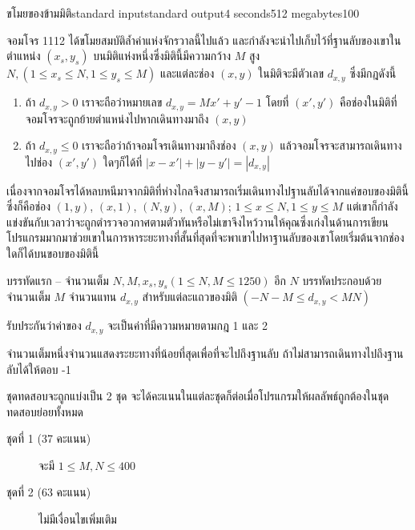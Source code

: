 \documentclass[11pt,a4paper]{article}
\begin{document}
\begin{problem}{ขโมยของข้ามมิติ}{standard input}{standard output}{4 seconds}{512 megabytes}{100}

จอมโจร 1112 ได้ขโมยสมบัติล้ำค่าแห่งจักรวาลนี้ไปแล้ว และกำลังจะนำไปเก็บไว้ที่ฐานลับของเขาในตำแหน่ง $(x_s,y_s)$ บนมิติแห่งหนึ่งซึ่งมิตินี้มีความกว้าง $M$ สูง $N, (1 \leq x_s \leq N,1 \leq y_s\leq M)$ และแต่ละช่อง $(x,y)$ ในมิติจะมีตัวเลข $d_{x,y}$ ซึ่งมีกฎดังนี้
\begin{enumerate}
\item 
ถ้า $d_{x,y}>0$ เราจะถือว่าหมายเลข $d_{x,y} = Mx' + y'-1$ โดยที่ $(x',y')$ คือช่องในมิติที่จอมโจรจะถูกย้ายตำแหน่งไปหากเดินทางมาถึง $(x,y)$

\item 	ถ้า $d_{x,y} \leq 0$ เราจะถือว่าถ้าจอมโจรเดินทางมาถึงช่อง $(x,y)$ แล้วจอมโจรจะสามารถเดินทางไปช่อง $(x',y')$ ใดๆก็ได้ที่ $|x-x' |+|y-y' |=|d_{x,y}|$

\end{enumerate}

เนื่องจากจอมโจรได้หลบหนีมาจากมิติที่ห่างไกลจึงสามารถเริ่มเดินทางไปฐานลับได้จากแค่ขอบของมิตินี้ ซึ่งก็คือช่อง $(1,y)$, $(x,1)$, 
$(N, y)$, $(x, M)$; $1 \leq x \leq N,1 \leq y \leq M$ แต่เขาก็กำลังแข่งขันกับเวลาว่าจะถูกตำรวจอวกาศตามตัวทันหรือไม่เขาจึงไหว้วานให้คุณซึ่งเก่งในด้านการเขียนโปรแกรมมากมาช่วยเขาในการหาระยะทางที่สั้นที่สุดที่จะพาเขาไปหาฐานลับของเขาโดยเริ่มต้นจากช่องใดก็ได้บนขอบของมิตินี้

\InputFile
บรรทัดแรก – จำนวนเต็ม $N,M,x_s,y_s (1 \leq N,M \leq 1250) $
อีก $N$ บรรทัดประกอบด้วยจำนวนเต็ม $M$ จำนวนแทน $d_{x,y}$ สำหรับแต่ละแถวของมิติ $(-N-M \leq d_{x,y} < MN)$

รับประกันว่าค่าของ $d_{x,y}$ จะเป็นค่าที่มีความหมายตามกฎ 1 และ 2

\OutputFile
จำนวนเต็มหนึ่งจำนวนแสดงระยะทางที่น้อยที่สุดเพื่อที่จะไปถึงฐานลับ ถ้าไม่สามารถเดินทางไปถึงฐานลับได้ให้ตอบ -1

\Scoring
ชุดทดสอบจะถูกแบ่งเป็น 2 ชุด จะได้คะแนนในแต่ละชุดก็ต่อเมื่อโปรแกรมให้ผลลัพธ์ถูกต้องในชุดทดสอบย่อยทั้งหมด

\begin{description}

\item[ชุดที่ 1 (37 คะแนน)] จะมี $ 1 \leq M, N \leq 400$

\item[ชุดที่ 2 (63 คะแนน)] ไม่มีเงื่อนไขเพิ่มเติม 

\end{description}


\end{problem}
\end{document}
